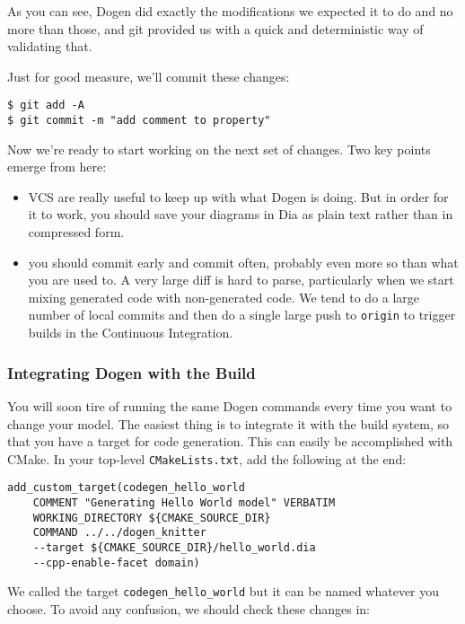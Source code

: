 \documentclass[11pt]{article}
\begin{document}
As you can see, Dogen did exactly the modifications we expected it to
do and no more than those, and git provided us with a quick and
deterministic way of validating that.

Just for good measure, we'll commit these changes:

\begin{verbatim}
$ git add -A
$ git commit -m "add comment to property"
\end{verbatim}

Now we're ready to start working on the next set of changes. Two key
points emerge from here:

\begin{itemize}
\item VCS are really useful to keep up with what Dogen is doing. But in
order for it to work, you should save your diagrams in Dia as plain
text rather than in compressed form.
\item you should commit early and commit often, probably even more so than
what you are used to. A very large diff is hard to parse,
particularly when we start mixing generated code with non-generated
code. We tend to do a large number of local commits and then do a
single large push to \texttt{origin} to trigger builds in the Continuous
Integration.
\end{itemize}

\subsubsection{Integrating Dogen with the Build}
\label{sec-3-2-6}

You will soon tire of running the same Dogen commands every time you
want to change your model. The easiest thing is to integrate it with
the build system, so that you have a target for code generation. This
can easily be accomplished with CMake. In your top-level
\texttt{CMakeLists.txt}, add the following at the end:

\begin{verbatim}
add_custom_target(codegen_hello_world
    COMMENT "Generating Hello World model" VERBATIM
    WORKING_DIRECTORY ${CMAKE_SOURCE_DIR}
    COMMAND ../../dogen_knitter
    --target ${CMAKE_SOURCE_DIR}/hello_world.dia
    --cpp-enable-facet domain)
\end{verbatim}

We called the target \texttt{codegen\_hello\_world} but it can be named
whatever you choose. To avoid any confusion, we should check these
changes in:
\end{document}
